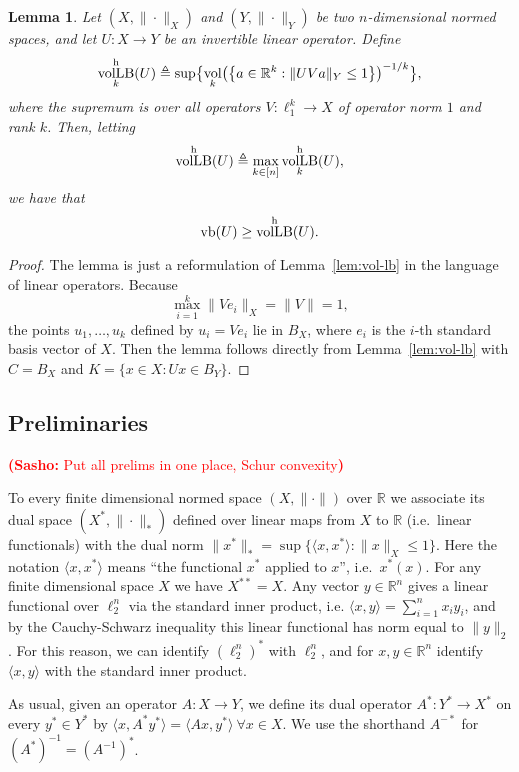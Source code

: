\documentclass[11pt]{article}
\newtheorem{lemma}{Lemma}
\newcommand{\R}{{\mathbb{R}}}
\newcommand{\eqdef}{\triangleq}
\newcommand{\set}[1]{\left\{ #1 \right\}}
\DeclareMathOperator{\vollb}{volLB}
\DeclareMathOperator{\vb}{vb}
\DeclareMathOperator{\vol}{vol}
\newcommand{\notename}[2]{{\textcolor{red}{{\bf (#1:} {#2}{\bf ) }}}}
\newcommand{\notename}[2]{{\textcolor{red}{\footnotesize{\bf (#1:} {#2}{\bf ) }}}}
\newcommand{\snote}[1]{{\notename{Sasho}{#1}}}
\newcommand{\notename}[2]{{}}
\newcommand{\snote}[1]{}
\begin{document}
\begin{lemma}
\label{lem:vol-lb-oper}
Let $(X, \|\cdot\|_X)$ and $(Y, \|\cdot\|_Y)$ be two $n$-dimensional
normed spaces, and let $U:X \to Y$ be an invertible linear
operator. Define
\[
\vollb_k^{\rm h}(U) \eqdef
\sup\bigl\{\vol_k\bigl(\set{a \in \R^k: \|UV a\|_Y \le 1}\bigr)^{-1/k}\bigr\},
\]
where the supremum is over all operators $V:\ell_1^k \to X$ of
operator norm $1$ and rank $k$. Then, letting
\[
\vollb^{\rm h}(U) \eqdef \max_{k \in [n]} \vollb_k^{\rm h}(U),
\]
we have that
\[
\vb(U) \geq \vollb^{\rm h}(U).
\]
\end{lemma}
\begin{proof}
  The lemma is just a reformulation of Lemma~\ref{lem:vol-lb} in the
  language of linear operators. Because 
  \[
  \max_{i = 1}^k{\|Ve_i\|_X} = \|V\| = 1,
  \]
  the points $u_1, \ldots, u_k$ defined by $u_i = V e_i$ lie in $B_X$,
  where $e_i$ is the $i$-th standard basis vector of $X$. Then the
  lemma follows directly from Lemma~\ref{lem:vol-lb} with $C = B_X$
  and $K = \{x \in X: Ux \in B_Y\}$. 
\end{proof}

\subsection{Preliminaries}

\snote{Put all prelims in one place, Schur convexity}

To every finite dimensional normed space $(X, \|\cdot\|)$ over $\R$ we
associate its dual space $(X^*, \|\cdot\|_*)$ defined over linear maps
from $X$ to $\R$ (i.e.~linear functionals) with the dual norm
$\|x^*\|_* = \sup\{\langle x, x^*\rangle: \|x\|_X \le 1\}$. Here the
notation $\langle x, x^*\rangle$ means ``the functional $x^*$ applied
to $x$'', i.e.~$x^*(x)$. For any finite dimensional space $X$ we have
$X^{**} = X$. Any vector $y \in \R^n$ gives a linear functional over
$\ell_2^n$ via the standard inner product, i.e. $\langle x, y \rangle
= \sum_{i = 1}^n{x_i y_i}$, and by the Cauchy-Schwarz inequality this
linear functional has norm equal to $\|y\|_2$. For this reason, we can
identify $(\ell_2^n)^*$ with $\ell_2^n$, and for $x, y \in \R^n$
identify $\langle x , y \rangle$ with the standard inner product.

As usual, given an operator $A:X \to Y$, we define its dual operator
$A^*:Y^* \to X^*$ on every $y^* \in Y^*$ by $\langle x ,
A^*y^*\rangle = \langle Ax, y^*\rangle\ \forall x \in X$. We use the
shorthand $A^{-*}$ for $(A^{*})^{-1} = (A^{-1})^*$. 
\end{document}
